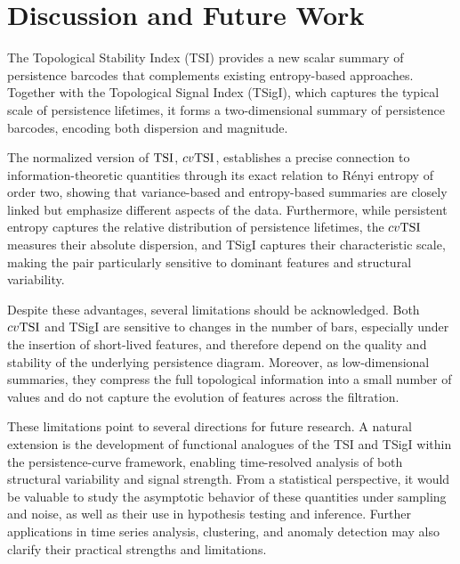\documentclass[11pt]{amsart}
\theoremstyle{definition}
\newcommand{\tsi}[0]{\textup{TSI}}
\begin{document}




\section{Discussion and Future Work}\label{Sec:Discussion and Future Work}
The Topological Stability Index (TSI) provides a new scalar summary of persistence barcodes that complements existing entropy-based approaches. Together with the Topological Signal Index (TSigI), which captures the typical scale of persistence lifetimes, it forms a two-dimensional summary of persistence barcodes, encoding both dispersion and magnitude.

The normalized version of $\tsi$, $cv\tsi$, establishes a precise connection to information-theoretic quantities through its exact relation to Rényi entropy of order two, showing that variance-based and entropy-based summaries are closely linked but emphasize different aspects of the data. Furthermore, while persistent entropy captures the relative distribution of persistence lifetimes, the $cv\tsi$ measures their absolute dispersion, and TSigI captures their characteristic scale, making the pair particularly sensitive to dominant features and structural variability. 

Despite these advantages, several limitations should be acknowledged. Both $cv\tsi$ and TSigI are sensitive to changes in the number of bars, especially under the insertion of short-lived features, and therefore depend on the quality and stability of the underlying persistence diagram. Moreover, as low-dimensional summaries, they compress the full topological information into a small number of values and do not capture the evolution of features across the filtration.

These limitations point to several directions for future research. A natural extension is the development of functional analogues of the TSI and TSigI within the persistence-curve framework, enabling time-resolved analysis of both structural variability and signal strength. From a statistical perspective, it would be valuable to study the asymptotic behavior of these quantities under sampling and noise, as well as their use in hypothesis testing and inference. Further applications in time series analysis, clustering, and anomaly detection may also clarify their practical strengths and limitations.


\printbibliography
\end{document}
